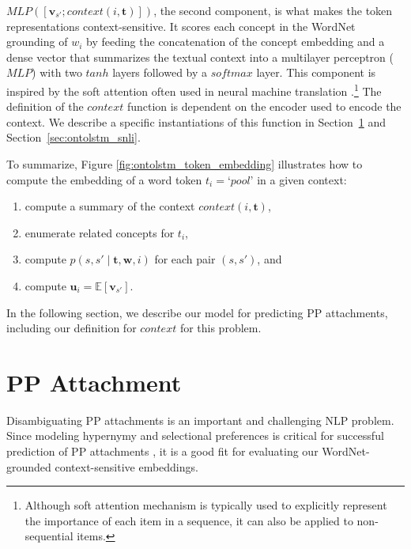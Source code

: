 $\textit{MLP}( [\mathbf{v}_{s'}; \textit{context}(i, \boldsymbol{t})])$, the second component, is what makes the token representations context-sensitive. 
It scores each concept in the WordNet grounding of $w_i$ by feeding the concatenation of the concept embedding and a dense vector that summarizes the textual context into a multilayer perceptron ($\textit{MLP}$) with two $tanh$ layers followed by a $softmax$ layer.
This component is inspired by the soft attention often used in neural machine translation \cite{bahdanau:14}.\footnote{Although soft attention mechanism is typically used to explicitly represent the importance of each item in a sequence, it can also be applied to non-sequential items.} The definition of the $\textit{context}$ function is dependent on the encoder used to encode the context.
We describe a specific instantiations of this function in Section~\ref{sec:ontolstm_pp_model} and Section~\ref{sec:ontolstm_snli}.

To summarize, Figure \ref{fig:ontolstm_token_embedding} illustrates how to compute the embedding of a word token $t_i=\textit{`pool'}$ in a given context:
\begin{enumerate}
    \item compute a summary of the context $\textit{context}(i, \boldsymbol{t})$,
    \item enumerate related concepts for $t_i$,
    \item compute $p(s,s'\mid \boldsymbol{t}, \boldsymbol{w}, i)$ for each pair $(s,s')$, and
    \item compute $\mathbf{u}_i = \mathbb{E}[\mathbf{v}_{s'}]$.
\end{enumerate}

In the following section, we describe our model for predicting PP attachments, including our definition for $\textit{context}$ for this problem.

\section{PP Attachment}
\label{sec:ontolstm_pp_model}
Disambiguating PP attachments is an important and challenging NLP problem. Since modeling hypernymy and selectional preferences is critical for successful prediction of PP attachments \cite{resnik:93}, it is a good fit for evaluating our WordNet-grounded context-sensitive embeddings.

